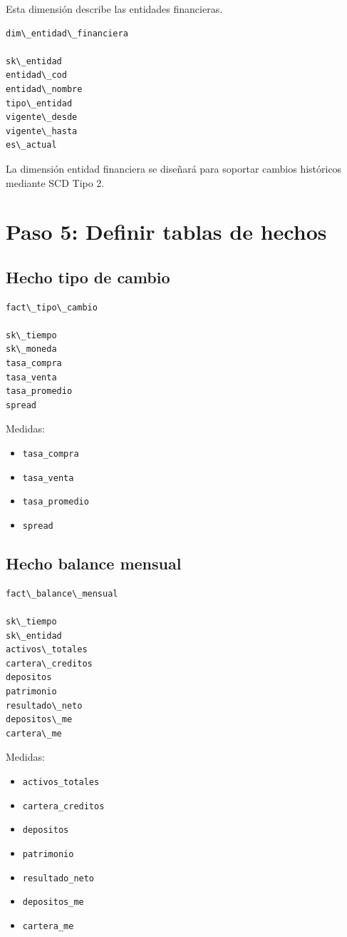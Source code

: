 Esta dimensión describe las entidades financieras.

\begin{verbatim}
dim\_entidad\_financiera

sk\_entidad
entidad\_cod
entidad\_nombre
tipo\_entidad
vigente\_desde
vigente\_hasta
es\_actual
\end{verbatim}

La dimensión entidad financiera se diseñará para soportar cambios históricos mediante SCD Tipo 2.

\section{Paso 5: Definir tablas de hechos}

\subsection{Hecho tipo de cambio}

\begin{verbatim}
fact\_tipo\_cambio

sk\_tiempo
sk\_moneda
tasa_compra
tasa_venta
tasa_promedio
spread
\end{verbatim}

Medidas:

\begin{itemize}
\item \texttt{tasa\_compra}
\item \texttt{tasa\_venta}
\item \texttt{tasa\_promedio}
\item \texttt{spread}
\end{itemize}

\subsection{Hecho balance mensual}

\begin{verbatim}
fact\_balance\_mensual

sk\_tiempo
sk\_entidad
activos\_totales
cartera\_creditos
depositos
patrimonio
resultado\_neto
depositos\_me
cartera\_me
\end{verbatim}

Medidas:

\begin{itemize}
\item \texttt{activos\_totales}
\item \texttt{cartera\_creditos}
\item \texttt{depositos}
\item \texttt{patrimonio}
\item \texttt{resultado\_neto}
\item \texttt{depositos\_me}
\item \texttt{cartera\_me}
\end{itemize}

